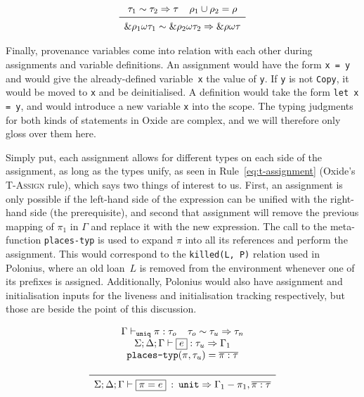 \documentclass[11pt,a4paper,twoside,openany]{report}
\newcommand{\InRust}[1]{\texttt{#1}}
\newcommand{\InDatalog}[1]{\texttt{#1}}
\newcommand{\expression}[1]{\boxed{#1}}
\newcommand{\ntyperule}[2]{\begin{array}{c}#1\\\midrule\raisebox{1pt}{\strut}#2\end{array}}
\renewcommand\_{\textunderscore\allowbreak}
\begin{document}
\begin{equation}\label{eq:u-ref}
  \ntyperule{
    \tau_1 \sim \tau_2 \Rightarrow \tau \:\:\:\:\: \rho_1 \cup \rho_2 = \rho}
  {
    \&\rho_1 \omega \tau_1 \sim \& \rho_2  \omega \tau_2 \Rightarrow \&\rho \omega \tau
  }
\end{equation}

Finally, provenance variables come into relation with each other during
assignments and variable definitions. An assignment would have the form
\InRust{x = y} and would give the already-defined variable~\InRust{x} the value
of \InRust{y}. If \InRust{y} is not \InRust{Copy}, it would be moved to
\InRust{x} and be deinitialised. A definition would take the form \InRust{let x
  = y}, and would introduce a new variable \InRust{x} into the scope. The typing
judgments for both kinds of statements in Oxide are complex, and we will
therefore only gloss over them here.

Simply put, each assignment allows for different types on each side of the
assignment, as long as the types unify, as seen in Rule~\eqref{eq:t-assignment}
(Oxide's \textsc{T-Assign} rule), which says two things of interest to us.
First, an assignment is only possible if the left-hand side of the expression
can be unified with the right-hand side (the prerequisite), and second that
assignment will remove the previous mapping of $\pi_1$ in $\Gamma$ and replace
it with the new expression. The call to the meta-function \texttt{places-typ} is
used to expand $\pi$ into all its references and perform the assignment. This
would correspond to the \InDatalog{killed(L, P)} relation used in Polonius,
where an old loan~$L$ is removed from the environment whenever one of its prefixes
is assigned. Additionally, Polonius would also have assignment and
initialisation inputs for the liveness and initialisation tracking respectively,
but those are beside the point of this discussion.

\begin{equation}\label{eq:t-assignment}
  \ntyperule{
    \Gamma \vdash_{\texttt{uniq}} \pi : \tau_o \:\:\:\:\:
    \tau_o \sim \tau_u \Rightarrow \tau_n \\
    \Sigma ; \Delta ; \Gamma \vdash \expression{e} : \tau_u \Rightarrow \Gamma_1 \\
    \texttt{places-typ}(\pi, \tau_u) = \overline{\pi : \tau} \\
  }
  {
    \Sigma ; \Delta ; \Gamma \vdash \expression{\pi = e} \: : \: \texttt{unit} \Rightarrow \Gamma_1 - \pi_1, \overline{\pi : \tau}
  }
\end{equation}
\end{document}
